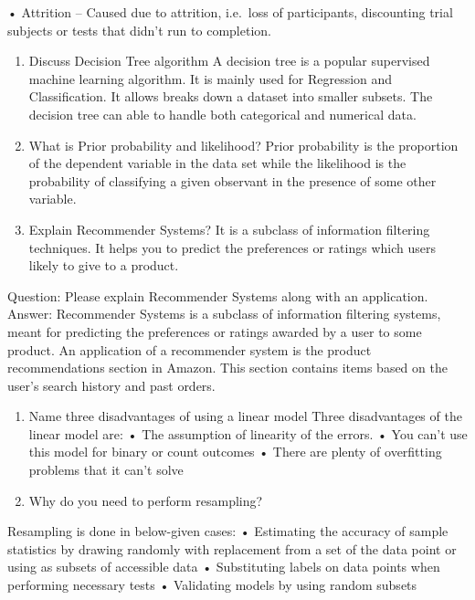 \documentclass[
]{book}
\begin{document}
• Attrition -- Caused due to attrition, i.e.~loss of participants, discounting trial subjects or tests that didn't run to completion.

\begin{enumerate}
\def\labelenumi{\arabic{enumi}.}
\setcounter{enumi}{3}
\item
  Discuss Decision Tree algorithm
  A decision tree is a popular supervised machine learning algorithm. It is mainly used for Regression and Classification. It allows breaks down a dataset into smaller subsets. The decision tree can able to handle both categorical and numerical data.
\item
  What is Prior probability and likelihood?
  Prior probability is the proportion of the dependent variable in the data set while the likelihood is the probability of classifying a given observant in the presence of some other variable.
\item
  Explain Recommender Systems?
  It is a subclass of information filtering techniques. It helps you to predict the preferences or ratings which users likely to give to a product.
\end{enumerate}

Question: Please explain Recommender Systems along with an application.
Answer: Recommender Systems is a subclass of information filtering systems, meant for predicting the preferences or ratings awarded by a user to some product.
An application of a recommender system is the product recommendations section in Amazon. This section contains items based on the user's search history and past orders.

\begin{enumerate}
\def\labelenumi{\arabic{enumi}.}
\setcounter{enumi}{6}
\item
  Name three disadvantages of using a linear model
  Three disadvantages of the linear model are:
  • The assumption of linearity of the errors.
  • You can't use this model for binary or count outcomes
  • There are plenty of overfitting problems that it can't solve
\item
  Why do you need to perform resampling?
\end{enumerate}

Resampling is done in below-given cases:
• Estimating the accuracy of sample statistics by drawing randomly with replacement from a set of the data point or using as subsets of accessible data
• Substituting labels on data points when performing necessary tests
• Validating models by using random subsets
\end{document}
